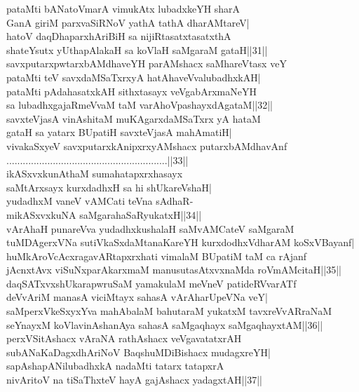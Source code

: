 \documentclass{article}
\begin{document}
pataMti bANatoVmarA vimukAtx lubadxkeYH sharA\\
GanA giriM parxvaSiRNoV yathA tathA dharAMtareV|\\
hatoV daqDhaparxhAriBiH sa nijiRtasatxtasatxthA\\
shateYsutx yUthapAlakaH sa koVlaH saMgaraM gataH||31||\\
savxputarxpwtarxbAMdhaveYH parAMshacx saMhareVtasx veY\\
pataMti teV savxdaMSaTxrxyA hatAhaveVvalubadhxkAH|\\
pataMti pAdahasatxkAH sithxtasayx veVgabArxmaNeYH\\
sa lubadhxgajaRmeVvaM taM varAhoVpashayxdAgataM||32||\\
savxteVjasA vinAshitaM muKAgarxdaMSaTxrx yA hataM\\
gataH sa yatarx BUpatiH savxteVjasA mahAmatiH|\\
vivakaSxyeV savxputarxkAnipxrxyAMshacx putarxbAMdhavAnf\\
...........................................................||33||\\
ikASxvxkunAthaM sumahatapxrxhasayx\\
saMtArxsayx kurxdadhxH sa hi shUkareVshaH|\\
yudadhxM vaneV vAMCati teVna sAdhaR-\\
mikASxvxkuNA saMgarahaSaRyukatxH||34||\\
vArAhaH punareVva yudadhxkushalaH saMvAMCateV saMgaraM\\
tuMDAgerxVNa sutiVkaSxdaMtanaKareYH kurxdodhxVdharAM koSxVBayanf|\\
huMkAroVcAcxragavARtapxrxhati vimalaM BUpatiM taM ca rAjanf\\
jAcnxtAvx viSuNxparAkarxmaM manusutasAtxvxnaMda roVmAMcitaH||35||\\
daqSATxvxshUkarapwruSaM yamakulaM meVneV patideRVvarATf\\
deVvAriM manasA viciMtayx sahasA vArAharUpeVNa veY|\\
saMperxVkeSxyxYva mahAbalaM bahutaraM yukatxM tavxreVvARraNaM\\
seYnayxM koVlavinAshanAya sahasA saMgaqhayx saMgaqhayxtAM||36||\\
perxVSitAshacx vAraNA rathAshacx veVgavatatxrAH\\
subANaKaDagxdhAriNoV BaqshuMDiBishacx mudagxreYH|\\
sapAshapANilubadhxkA nadaMti tatarx tatapxrA\\
nivAritoV na tiSaThxteV hayA gajAshacx yadagxtAH||37||\\
\end{document}
